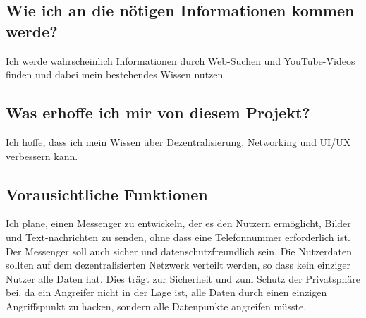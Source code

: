 \subsection{Wie ich an die nötigen Informationen kommen werde?}
Ich werde wahrscheinlich Informationen durch Web-Suchen und YouTube-Videos finden und dabei mein bestehendes Wissen nutzen
\subsection{Was erhoffe ich mir von diesem Projekt?}
Ich hoffe, dass ich mein Wissen über Dezentralisierung, Networking und UI/UX verbessern kann.
\subsection{Vorausichtliche Funktionen}
Ich plane, einen Messenger zu entwickeln, der es den Nutzern ermöglicht, Bilder und Text-nachrichten zu senden, ohne dass eine Telefonnummer erforderlich ist. 
Der Messenger soll auch sicher und datenschutzfreundlich sein. Die Nutzerdaten sollten auf dem dezentralisierten Netzwerk verteilt werden, so dass kein einziger Nutzer alle Daten hat. Dies trägt zur Sicherheit und zum Schutz der Privatsphäre bei, da ein Angreifer nicht in der Lage ist, alle Daten durch einen einzigen Angriffspunkt zu hacken, sondern alle Datenpunkte angreifen müsste.